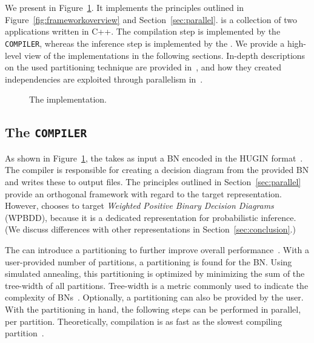 \section{\toolname}
\label{sec:tool}\label{sec:implementation}

We present \toolname in Figure~\ref{fig:implementation}. It implements the principles outlined in Figure~\ref{fig:frameworkoverview} and Section~\ref{sec:parallel}. \toolname is a collection of two applications written in C++. The compilation step is implemented by the \verb+COMPILER+, whereas the inference step is implemented by the \engine. We provide a high-level view of the implementations in the following sections.
In-depth descriptions on the used partitioning technique are provided in~\cite{dal2017reducing,dal2021compositional}, and how they created independencies are exploited through parallelism in~\cite{dal2018parallel}.

\begin{figure}[!t]
    \centering
    
    \caption{The implementation.}
    \label{fig:implementation}
\end{figure}

\subsection{The \texttt{COMPILER}}

As shown in Figure~\ref{fig:implementation}, the \compiler takes as input a BN encoded in the HUGIN format~\cite{madsen2003hugin}. The compiler is responsible for creating a decision diagram from the provided BN and writes these to output files. The principles outlined in Section~\ref{sec:parallel} provide an orthogonal framework with regard to the target representation. However, \toolname chooses to target \emph{Weighted Positive Binary Decision Diagrams} (WPBDD), because it is a dedicated representation for probabilistic inference. (We discuss differences with other representations in Section~\ref{sec:conclusion}.)

The \compiler can introduce a partitioning to further improve overall performance~\cite{dal2017reducing}. With a user-provided number of partitions, a partitioning is found for the BN. Using simulated annealing, this partitioning is optimized by minimizing the sum of the  tree-width of all partitions. Tree-width is a metric commonly used to indicate the complexity of BNs~\cite{chen2022definition}. Optionally, a partitioning can also be provided by the user. With the partitioning in hand, the following steps can be performed in parallel, per partition. Theoretically, compilation is as fast as the slowest compiling partition~\cite{dal2018parallel}.

